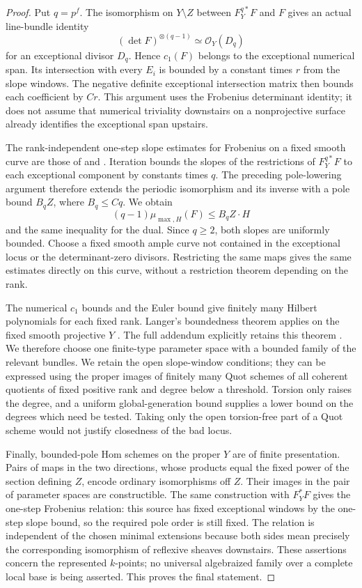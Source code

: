 \begin{proof}
Put $q=p^f$. The isomorphism on $Y\setminus Z$ between $F_Y^{q*}F$
and $F$ gives an actual line-bundle identity
\[
 (\det F)^{\otimes(q-1)}\simeq\mathcal O_Y(D_q)
\]
for an exceptional divisor $D_q$. Hence $c_1(F)$ belongs to the
exceptional numerical span. Its intersection with every $E_i$ is
bounded by a constant times $r$ from the slope windows. The negative
definite exceptional intersection matrix then bounds each coefficient
by $Cr$. This argument uses the Frobenius determinant identity; it
does not assume that numerical triviality downstairs on a nonprojective
surface already identifies the exceptional span upstairs.

The rank-independent one-step slope estimates for Frobenius on a fixed
smooth curve are those of
\citet[Theorem 2.2]{C_Sun2008} and
\citet[Proposition 1.3]{C_MehtaPauly2007}. Iteration bounds the slopes
of the restrictions of $F_Y^{q*}F$ to each exceptional component by
constants times $q$. The preceding pole-lowering argument therefore
extends the periodic isomorphism and its inverse with a pole bound
$B_qZ$, where $B_q\le Cq$. We obtain
\[
 (q-1)\mu_{\max,H}(F)\le B_q Z\cdot H
\]
and the same inequality for the dual. Since $q\ge2$, both slopes are
uniformly bounded. Choose a fixed smooth ample curve not contained in
the exceptional locus or the determinant-zero divisors. Restricting
the same maps gives the same estimates directly on this curve, without
a restriction theorem depending on the rank.

The numerical $c_1$ bounds and the Euler bound give finitely many
Hilbert polynomials for each fixed rank. Langer's boundedness theorem
applies on the fixed smooth projective $Y$
\citep[Theorem 4.2, printed p.~269]{C_LangerBounded2004}.
The full addendum explicitly retains this theorem
\citep{C_LangerAddendum2004}. We therefore choose one finite-type
parameter space with a bounded family of the relevant bundles. We
retain the open slope-window conditions; they can be expressed using
the proper images of finitely many Quot schemes of all coherent
quotients of fixed positive rank and degree below a threshold. Torsion
only raises the degree, and a uniform global-generation bound supplies
a lower bound on the degrees which need be tested. Taking only the
open torsion-free part of a Quot scheme would not justify closedness
of the bad locus.

Finally, bounded-pole Hom schemes on the proper $Y$ are of finite
presentation. Pairs of maps in the two directions, whose products equal
the fixed power of the section defining $Z$, encode ordinary
isomorphisms off $Z$. Their images in the pair of parameter spaces are
constructible. The same construction with $F_Y^*F$ gives the
one-step Frobenius relation: this source has fixed exceptional windows
by the one-step slope bound, so the required pole order is still fixed.
The relation is independent of the chosen minimal extensions because
both sides mean precisely the corresponding isomorphism of reflexive
sheaves downstairs. These assertions concern the represented
$k$-points; no universal algebraized family over a complete local base
is being asserted. This proves the final statement.
\end{proof}

